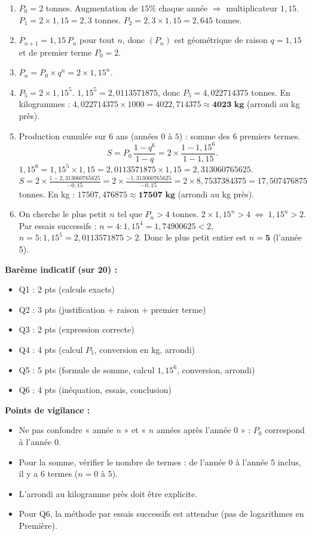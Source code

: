 \documentclass[11pt]{article}
\newcommand{\cle}[1]{{\popxbold\color{popdark}#1}}
\begin{document}
\begin{corrige}
\begin{enumerate}
\item $P_0 = 2$ tonnes. Augmentation de $15\%$ chaque année $\Rightarrow$ multiplicateur $1,15$.
  $P_1 = 2 \times 1,15 = 2,3$ tonnes.
  $P_2 = 2,3 \times 1,15 = 2,645$ tonnes.
\item $P_{n+1} = 1,15\,P_n$ pour tout $n$, donc $(P_n)$ est \cle{géométrique} de raison $q = 1,15$ et de premier terme $P_0 = 2$.
\item $P_n = P_0 \times q^n = 2 \times 1,15^n$.
\item $P_5 = 2 \times 1,15^5$. $1,15^5 = 2,0113571875$, donc $P_5 = 4,022714375$ tonnes.
  En kilogrammes : $4,022714375 \times 1000 = 4022,714375 \approx \textbf{4023 kg}$ (arrondi au kg près).
\item Production cumulée sur 6 ans (années $0$ à $5$) : somme des 6 premiers termes.
  \[
  S = P_0\,\frac{1-q^6}{1-q} = 2 \times \frac{1-1,15^6}{1-1,15}.
  \]
  $1,15^6 = 1,15^5 \times 1,15 = 2,0113571875 \times 1,15 = 2,313060765625$.
  $S = 2 \times \frac{1-2,313060765625}{-0,15} = 2 \times \frac{-1,313060765625}{-0,15} = 2 \times 8,7537384375 = 17,507476875$ tonnes.
  En kg : $17507,476875 \approx \textbf{17507 kg}$ (arrondi au kg près).
\item On cherche le plus petit $n$ tel que $P_n > 4$ tonnes.
  $2 \times 1,15^n > 4 \;\Leftrightarrow\; 1,15^n > 2$.
  Par essais successifs :
  $n=4 : 1,15^4 = 1,74900625 < 2$,
  $n=5 : 1,15^5 = 2,0113571875 > 2$.
  Donc le plus petit entier est $n = \textbf{5}$ (l'année 5).
\end{enumerate}

\textbf{Barème indicatif (sur 20) :}
\begin{itemize}
\item Q1 : 2 pts (calculs exacts)
\item Q2 : 3 pts (justification + raison + premier terme)
\item Q3 : 2 pts (expression correcte)
\item Q4 : 4 pts (calcul $P_5$, conversion en kg, arrondi)
\item Q5 : 5 pts (formule de somme, calcul $1,15^6$, conversion, arrondi)
\item Q6 : 4 pts (inéquation, essais, conclusion)
\end{itemize}

\textbf{Points de vigilance :}
\begin{itemize}
\item Ne pas confondre « année $n$ » et « $n$ années après l'année 0 » : $P_0$ correspond à l'année 0.
\item Pour la somme, vérifier le nombre de termes : de l'année 0 à l'année 5 inclus, il y a 6 termes ($n=0$ à $5$).
\item L'arrondi au kilogramme près doit être explicite.
\item Pour Q6, la méthode par essais successifs est attendue (pas de logarithmes en Première).
\end{itemize}
\end{corrige}
\end{document}
